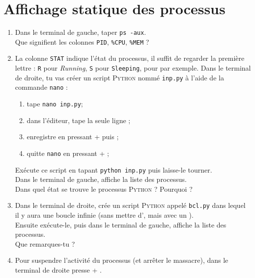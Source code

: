 \documentclass[a4paper,12pt,french]{book}
\begin{document}
\section*{Affichage statique des processus}
\begin{enumerate}[\bfseries 1.]
    \item Dans le terminal de gauche, taper \texttt{ps -aux}.\\
    Que signifient les colonnes \texttt{PID}, \texttt{\%CPU}, \texttt{\%MEM} ?\\

    \item La colonne \texttt{STAT} indique l'état du processus, il suffit de regarder la première lettre : \texttt{R} pour \textit{Running}, \texttt{S} pour \texttt{Sleeping},  pour  par exemple.
        Dans le terminal de droite, tu vas créer un script \textsc{Python} nommé \texttt{inp.py} à l'aide de la commande \texttt{nano} :
        \begin{enumerate}[--]
        	\item tape \texttt{nano inp.py};
            \item dans l'éditeur, tape la seule ligne ;
            \item enregistre en pressant  +  puis ;
            \item quitte \texttt{nano} en pressant  + ;\\
        \end{enumerate}
        Exécute ce script en tapant \texttt{python inp.py} puis laisse-le tourner.\\
        Dans le terminal de gauche, affiche la liste des processus.\\
        Dans quel état se trouve le processus \textsc{Python} ? Pourquoi ?\\

    \item Dans le terminal de droite, crée un script \textsc{Python} appelé \texttt{bcl.py} dans lequel il y aura une boucle infinie (sans mettre d', mais avec un ).\\
        Ensuite exécute-le, puis dans le terminal de gauche, affiche la liste des processus.\\
        Que remarques-tu ?\\

    \item Pour suspendre l'activité du processus (et arrêter le massacre), dans le terminal de droite presse  + .\\


\end{enumerate}
\end{document}
